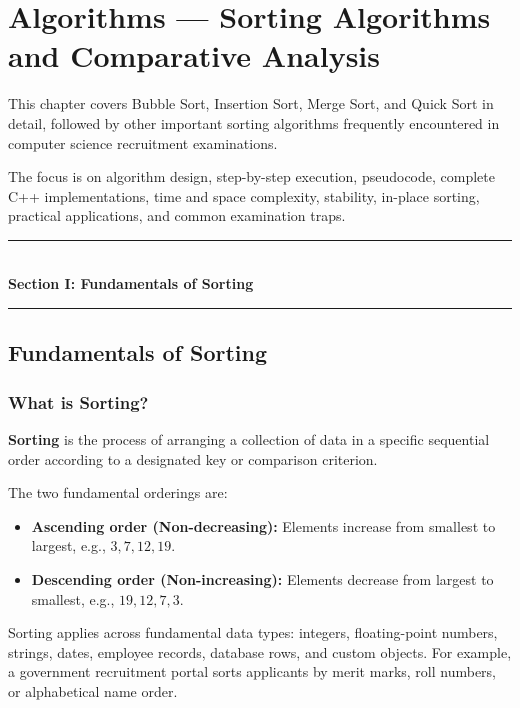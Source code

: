 \chapter{Algorithms --- Sorting Algorithms and Comparative Analysis}
\label{ch:algorithms_sorting}

This chapter covers Bubble Sort, Insertion Sort, Merge Sort, and Quick Sort in detail, followed by other important sorting algorithms frequently encountered in computer science recruitment examinations.

The focus is on algorithm design, step-by-step execution, pseudocode, complete C++ implementations, time and space complexity, stability, in-place sorting, practical applications, and common examination traps.

\begin{center}
\vspace{0.5em}
{\color{primary}\rule{0.45\textwidth}{1.2pt}}\\[4pt]
{\Large\bfseries\color{primary} Section I: Fundamentals of Sorting}\\[2pt]
{\color{primary}\rule{0.45\textwidth}{1.2pt}}
\vspace{0.5em}
\end{center}

\section{Fundamentals of Sorting}

\subsection{What is Sorting?}

\textbf{Sorting} is the process of arranging a collection of data in a specific sequential order according to a designated key or comparison criterion.

The two fundamental orderings are:
\begin{itemize}
    \item \textbf{Ascending order (Non-decreasing):} Elements increase from smallest to largest, e.g., $3, 7, 12, 19$.
    \item \textbf{Descending order (Non-increasing):} Elements decrease from largest to smallest, e.g., $19, 12, 7, 3$.
\end{itemize}

Sorting applies across fundamental data types: integers, floating-point numbers, strings, dates, employee records, database rows, and custom objects. For example, a government recruitment portal sorts applicants by merit marks, roll numbers, or alphabetical name order.

